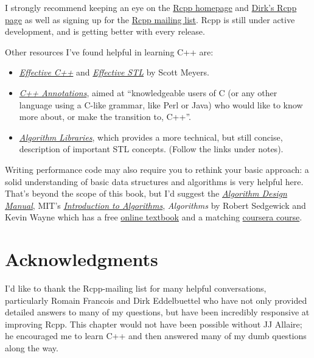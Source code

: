 I strongly recommend keeping an eye on the
\href{http://www.rcpp.org}{Rcpp homepage} and
\href{http://dirk.eddelbuettel.com/code/rcpp.html}{Dirk's Rcpp page} as
well as signing up for the
\href{http://lists.r-forge.r-project.org/cgi-bin/mailman/listinfo/rcpp-devel}{Rcpp
mailing list}. Rcpp is still under active development, and is getting
better with every release.

Other resources I've found helpful in learning C++ are:

\begin{itemize}
\item
  \href{http://amzn.com/0321334876?tag=devtools-20}{\emph{Effective
  C++}} and
  \href{http://amzn.com/0201749629?tag=devtools-20}{\emph{Effective
  STL}} by Scott Meyers.
\item
  \href{http://www.icce.rug.nl/documents/cplusplus/cplusplus.html}{\emph{C++
  Annotations}}, aimed at ``knowledgeable users of C (or any other
  language using a C-like grammar, like Perl or Java) who would like to
  know more about, or make the transition to, C++''.
\item
  \href{http://www.cs.helsinki.fi/u/tpkarkka/alglib/k06/}{\emph{Algorithm
  Libraries}}, which provides a more technical, but still concise,
  description of important STL concepts. (Follow the links under notes).
\end{itemize}

Writing performance code may also require you to rethink your basic
approach: a solid understanding of basic data structures and algorithms
is very helpful here. That's beyond the scope of this book, but I'd
suggest the
\href{http://amzn.com/0387948600?tag=devtools-20}{\emph{Algorithm Design
Manual}}, MIT's
\href{http://ocw.mit.edu/courses/electrical-engineering-and-computer-science/6-046j-introduction-to-algorithms-sma-5503-fall-2005/}{\emph{Introduction
to Algorithms}}, \emph{Algorithms} by Robert Sedgewick and Kevin Wayne
which has a free \href{http://algs4.cs.princeton.edu/home/}{online
textbook} and a matching
\href{https://www.coursera.org/course/algs4partI}{coursera course}.

\section{Acknowledgments}

I'd like to thank the Rcpp-mailing list for many helpful conversations,
particularly Romain Francois and Dirk Eddelbuettel who have not only
provided detailed answers to many of my questions, but have been
incredibly responsive at improving Rcpp. This chapter would not have
been possible without JJ Allaire; he encouraged me to learn C++ and then
answered many of my dumb questions along the way.
